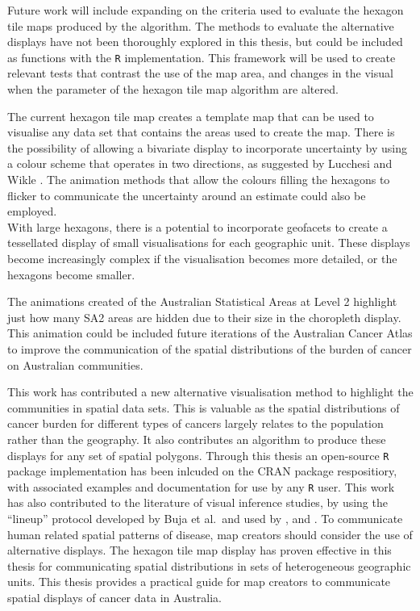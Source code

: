 \documentclass{monashthesis}
\begin{document}
Future work will include expanding on the criteria used to evaluate the hexagon tile maps produced by the algorithm. The methods to evaluate the alternative displays have not been thoroughly explored in this thesis, but could be included as functions with the \texttt{R} implementation. This framework will be used to create relevant tests that contrast the use of the map area, and changes in the visual when the parameter of the hexagon tile map algorithm are altered.

The current hexagon tile map creates a template map that can be used to visualise any data set that contains the areas used to create the map. There is the possibility of allowing a bivariate display to incorporate uncertainty by using a colour scheme that operates in two directions, as suggested by Lucchesi and Wikle \autocite{VUADBC}.
The animation methods that allow the colours filling the hexagons to flicker to communicate the uncertainty around an estimate could also be employed.\\
With large hexagons, there is a potential to incorporate geofacets \autocite{IGF} to create a tessellated display of small visualisations for each geographic unit. These displays become increasingly complex if the visualisation becomes more detailed, or the hexagons become smaller.

The animations created of the Australian Statistical Areas at Level 2 highlight just how many SA2 areas are hidden due to their size in the choropleth display. This animation could be included future iterations of the Australian Cancer Atlas to improve the communication of the spatial distributions of the burden of cancer on Australian communities.

This work has contributed a new alternative visualisation method to highlight the communities in spatial data sets. This is valuable as the spatial distributions of cancer burden for different types of cancers largely relates to the population rather than the geography. It also contributes an algorithm to produce these displays for any set of spatial polygons. Through this thesis an open-source \texttt{R} package implementation has been inlcuded on the CRAN package respositiory, with associated examples and documentation for use by any \texttt{R} user.
This work has also contributed to the literature of visual inference studies, by using the ``lineup'' protocol developed by Buja et al.~and used by \textcite{GIIV}, and \textcite{GTPCCD}.
To communicate human related spatial patterns of disease, map creators should consider the use of alternative displays. The hexagon tile map display has proven effective in this thesis for communicating spatial distributions in sets of heterogeneous geographic units. This thesis provides a practical guide for map creators to communicate spatial displays of cancer data in Australia.
\end{document}
